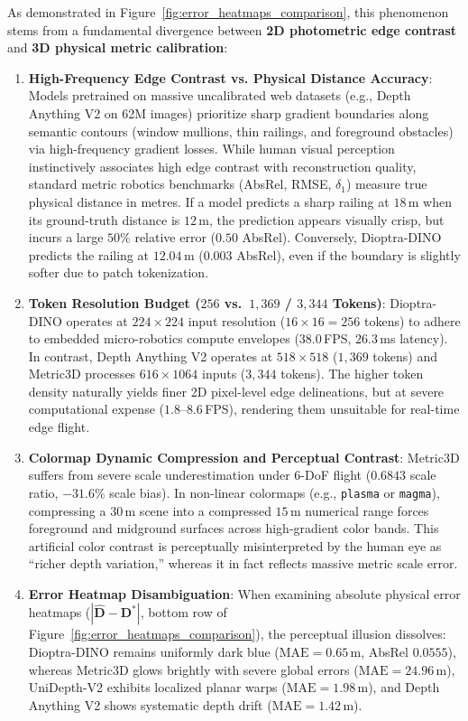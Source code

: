 As demonstrated in Figure~\ref{fig:error_heatmaps_comparison}, this phenomenon stems from a fundamental divergence between \textbf{2D photometric edge contrast} and \textbf{3D physical metric calibration}:
\begin{enumerate}
    \item \textbf{High-Frequency Edge Contrast vs. Physical Distance Accuracy}: Models pretrained on massive uncalibrated web datasets (e.g., Depth Anything V2 on 62M images) prioritize sharp gradient boundaries along semantic contours (window mullions, thin railings, and foreground obstacles) via high-frequency gradient losses. While human visual perception instinctively associates high edge contrast with reconstruction quality, standard metric robotics benchmarks (AbsRel, RMSE, $\delta_1$) measure true physical distance in metres. If a model predicts a sharp railing at $18$\,m when its ground-truth distance is $12$\,m, the prediction appears visually crisp, but incurs a large $50\%$ relative error ($0.50$ AbsRel). Conversely, Dioptra-DINO predicts the railing at $12.04$\,m ($0.003$ AbsRel), even if the boundary is slightly softer due to patch tokenization.
    \item \textbf{Token Resolution Budget ($256$ vs.\ $1{,}369$ / $3{,}344$ Tokens)}: Dioptra-DINO operates at $224 \times 224$ input resolution ($16 \times 16 = 256$ tokens) to adhere to embedded micro-robotics compute envelopes ($38.0$\,FPS, $26.3$\,ms latency). In contrast, Depth Anything V2 operates at $518 \times 518$ ($1{,}369$ tokens) and Metric3D processes $616 \times 1064$ inputs ($3{,}344$ tokens). The higher token density naturally yields finer 2D pixel-level edge delineations, but at severe computational expense ($1.8\text{--}8.6$\,FPS), rendering them unsuitable for real-time edge flight.
    \item \textbf{Colormap Dynamic Compression and Perceptual Contrast}: Metric3D suffers from severe scale underestimation under 6-DoF flight ($0.6843$ scale ratio, $-31.6\%$ scale bias). In non-linear colormaps (e.g., \texttt{plasma} or \texttt{magma}), compressing a $30$\,m scene into a compressed $15$\,m numerical range forces foreground and midground surfaces across high-gradient color bands. This artificial color contrast is perceptually misinterpreted by the human eye as ``richer depth variation,'' whereas it in fact reflects massive metric scale error.
    \item \textbf{Error Heatmap Disambiguation}: When examining absolute physical error heatmaps ($|\hat{\mathbf{D}} - \mathbf{D}^*|$, bottom row of Figure~\ref{fig:error_heatmaps_comparison}), the perceptual illusion dissolves: Dioptra-DINO remains uniformly dark blue ($\text{MAE} = 0.65$\,m, AbsRel $0.0555$), whereas Metric3D glows brightly with severe global errors ($\text{MAE} = 24.96$\,m), UniDepth-V2 exhibits localized planar warps ($\text{MAE} = 1.98$\,m), and Depth Anything V2 shows systematic depth drift ($\text{MAE} = 1.42$\,m).
\end{enumerate}

